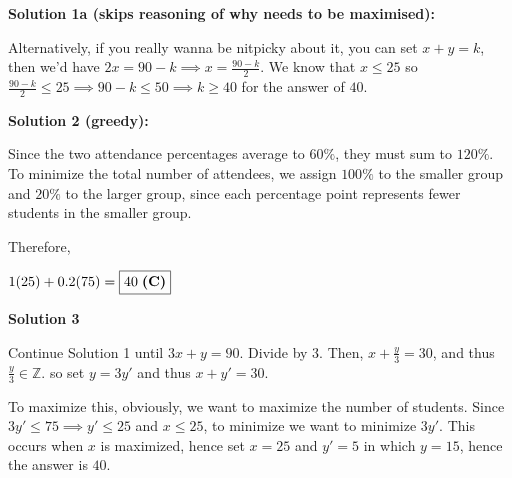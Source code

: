 \begin{enumerate}
 



\textbf{Solution 1a (skips reasoning of why  needs to be maximised):}

Alternatively, if you really wanna be nitpicky about it, you can set $x+y=k$, then we'd have $2x=90-k\implies x=\frac{90-k}2$. We know that $x\le 25$ so $\frac{90-k}2\le 25\implies 90-k\le 50\implies k\ge 40$ for the answer of $40$.

 



\textbf{Solution 2 (greedy):}

Since the two attendance percentages average to $60\%$, they must sum to $120\%$. To minimize the total number of attendees, we assign $100\%$ to the smaller group and $20\%$ to the larger group, since each percentage point represents fewer students in the smaller group.

 Therefore,

 $1(25)+0.2(75)=\boxed{40 \hspace{1mm}\textbf{(C)}}$




\textbf{Solution 3}

Continue Solution 1 until $3x + y = 90$. Divide by 3. Then, $x + \frac{y}{3} = 30$, and thus $\frac{y}{3} \in \mathbb{Z}$. so set $y = 3y'$ and thus $x + y' = 30$.

 To maximize this, obviously, we want to maximize the number of students. Since $3y' \leq 75 \implies y' \leq 25$ and $x \leq 25$, to minimize we want to minimize $3y'$. This occurs when $x$ is maximized, hence set $x = 25$ and $y' = 5$ in which $y = 15$, hence the answer is $\boxed{40}$.

 



\end{enumerate}
